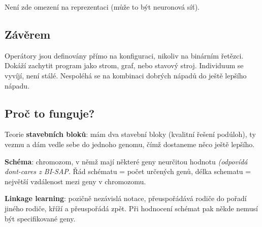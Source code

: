 \vspace{4pt}
\noindent Není zde omezení na reprezentaci (může to být neuronová síť).

\subsection{Závěrem}

Operátory jsou definovány přímo na konfiguraci, nikoliv na binárním řetězci. Dokáží zachytit program jako strom, graf, nebo stavový stroj. Individuum se vyvíjí, není stálé. Nespoléhá se na kombinaci dobrých nápadů do ještě lepšího nápadu.

\subsection{Proč to funguje?}

Teorie \textbf{stavebních bloků}: mám dva stavební bloky (kvalitní řešení podúloh), ty vezmu a dám vedle sebe do jednoho genomu, čímž dostaneme něco ještě lepšího. 

\vspace{4pt}
\noindent \textbf{Schéma}: chromozom, v němž mají některé geny neurčitou hodnotu \textit{(odpovídá dont-cares z BI-SAP}. Řád schématu = počet určených genů, délka schematu = největší vzdálenost mezi geny v chromozomu.

\vspace{4pt}
\noindent \textbf{Linkage learning}: pozičně nezávislá notace, přeuspořádává rodiče do pořadí jiného rodiče, kříží a přeuspořádá zpět. Při hodnocení schémat pak někde nemusí být specifikované geny. 

